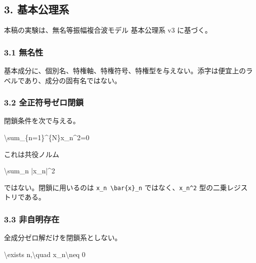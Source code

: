 \documentclass[
  a4paper,
]{article}
\newenvironment{Shaded}{}{}
\newcommand{\NormalTok}[1]{#1}
\begin{document}
\subsection{3. 基本公理系}\label{ux57faux672cux516cux7406ux7cfb}

本稿の実験は、無名等振幅複合波モデル 基本公理系 v3 に基づく。

\subsubsection{3.1 無名性}\label{ux7121ux540dux6027}

基本成分に、個別名、特権軸、特権符号、特権型を与えない。添字は便宜上のラベルであり、成分の固有名ではない。

\subsubsection{3.2
全正符号ゼロ閉鎖}\label{ux5168ux6b63ux7b26ux53f7ux30bcux30edux9589ux9396}

閉鎖条件を次で与える。

\begin{Shaded}
\begin{Highlighting}[]
\NormalTok{\textbackslash{}sum\_\{n=1\}\^{}\{N\}x\_n\^{}2=0}
\end{Highlighting}
\end{Shaded}

これは共役ノルム

\begin{Shaded}
\begin{Highlighting}[]
\NormalTok{\textbackslash{}sum\_n |x\_n|\^{}2}
\end{Highlighting}
\end{Shaded}

ではない。閉鎖に用いるのは \texttt{x\_n\ \textbackslash{}bar\{x\}\_n}
ではなく、\texttt{x\_n\^{}2} 型の二乗レジストリである。

\subsubsection{3.3 非自明存在}\label{ux975eux81eaux660eux5b58ux5728}

全成分ゼロ解だけを閉鎖系としない。

\begin{Shaded}
\begin{Highlighting}[]
\NormalTok{\textbackslash{}exists n,\textbackslash{}quad x\_n\textbackslash{}neq 0}
\end{Highlighting}
\end{Shaded}
\end{document}
